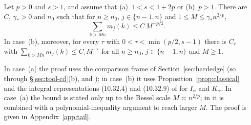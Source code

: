 \begin{proposition}\label{prop:tail}
Let $p>0$ and $s>1$, and assume that \textup{(a)}~$1<s<1+2p$ or \textup{(b)}~$p>1$. There are $C$, $\gamma_*>0$ and $n_0$ such that for $n\ge n_0$, $j\in\{n-1,n\}$ and $1\le M\le \gamma_*n^{2/p}$,
\begin{equation}\label{eq:tail-arcsine}
  \sum_{k>Mn}m_j(k)\le C\,M^{-p/2}.
\end{equation}
In case~(b), moreover, for every $\tau$ with $0<\tau<\min(p/2,s-1)$ there is $C_\tau$ with
$\sum_{k>Mn}m_j(k)\le C_\tau M^{-\tau}$ for all $n\ge n_0$, $j\in\{n-1,n\}$ and $M\ge1$.
\end{proposition}

In case~(a) the proof uses the comparison frame of Section~\ref{sec:hardedge} (so \cite[Theorem~4.4]{CD} through
\S\ref{sec:tool-cd}(b), and \cite[\S6]{KMVV}); in case~(b) it uses Proposition~\ref{prop:classical} and the integral
representations (10.32.4) and (10.32.9) of \cite{DLMF} for $I_\alpha$ and $K_\alpha$. In case~(a) the bound is stated
only up to the Bessel scale $M\asymp n^{2/p}$; in \cite{Paper3} it is combined with a
polynomial-inequality argument to reach larger $M$. The proof is given in Appendix~\ref{app:tail}.
